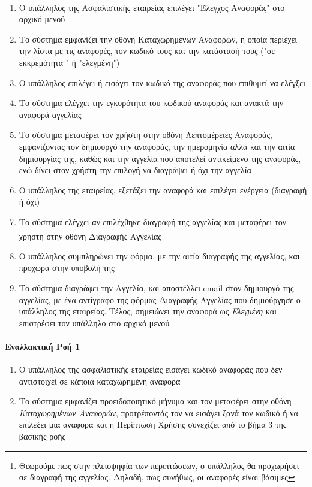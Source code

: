 \documentclass{../ol-softwaremanual}
\begin{document}
	\paragraph{}
	\begin{enumerate}
		\item Ο υπάλληλος της Ασφαλιστικής εταιρείας επιλέγει \en"\gr Έλεγχος Αναφοράς\en" \gr στο αρχικό μενού
		\item Το σύστημα εμφανίζει την οθόνη Καταχωρημένων Αναφορών, η οποία περιέχει την λίστα με τις αναφορές, τον κωδικό τους και την κατάστασή τους (\en"\gr σε εκκρεμότητα \en" \gr ή \en"\gr ελεγμένη\en"\gr)
		\item Ο υπάλληλος επιλέγει ή εισάγει τον κωδικό της αναφοράς που επιθυμεί να ελέγξει 
		\item Το σύστημα ελέγχει την εγκυρότητα του κωδικού αναφοράς και ανακτά την αναφορά αγγελίας
		\item Το σύστημα μεταφέρει τον χρήστη στην οθόνη Λεπτομέρειες Αναφοράς, εμφανίζοντας τον δημιουργό την αναφοράς, την ημερομηνία αλλά και την αιτία δημιουργίας της, καθώς και την αγγελία που αποτελεί αντικείμενο της αναφοράς, ενώ δίνει στον χρήστη την επιλογή να διαγράψει ή όχι την αγγελία
		\item Ο υπάλληλος της εταιρείας, εξετάζει την αναφορά και επιλέγει ενέργεια (διαγραφή ή όχι)
		\item Το σύστημα ελέγχει αν επιλέχθηκε διαγραφή της αγγελίας και μεταφέρει τον χρήστη στην οθόνη Διαγραφής Αγγελίας \footnote[2]{Θεωρούμε πως στην πλειοψηφία των περιπτώσεων, ο υπάλληλος θα προχωρήσει σε διαγραφή της αγγελίας. Δηλαδή, πως συνήθως, οι αναφορές είναι βάσιμες}
		\item Ο υπάλληλος συμπληρώνει την φόρμα, με την αιτία διαγραφής της αγγελίας, και προχωρά στην υποβολή της
		\item Το σύστημα διαγράφει την Αγγελία,  και αποστέλλει \en email \gr στον δημιουργό της αγγελίας, με ένα αντίγραφο της φόρμας Διαγραφής Αγγελίας που δημιούργησε ο υπάλληλος της εταιρείας. Τέλος, σημειώνει την αναφορά ως \textit{Ελεγμένη} και επιστρέφει τον υπάλληλο στο αρχικό μενού
	\end{enumerate}
	
	\paragraph{Εναλλακτική Ροή 1}
	\begin{enumerate}
		\item Ο υπάλληλος της ασφαλιστικής εταιρείας εισάγει κωδικό αναφοράς που δεν αντιστοιχεί σε κάποια καταχωρημένη αναφορά
		\item Το σύστημα εμφανίζει προειδοποιητικό μήνυμα και τον μεταφέρει στην οθόνη \textit{Καταχωρημένων Αναφορών}, προτρέποντάς τον να εισάγει ξανά τον κωδικό ή να επιλέξει μια αναφορά και η Περίπτωση Χρήσης συνεχίζει από το βήμα 3 της βασικής ροής
	\end{enumerate}	
	
\end{document}
